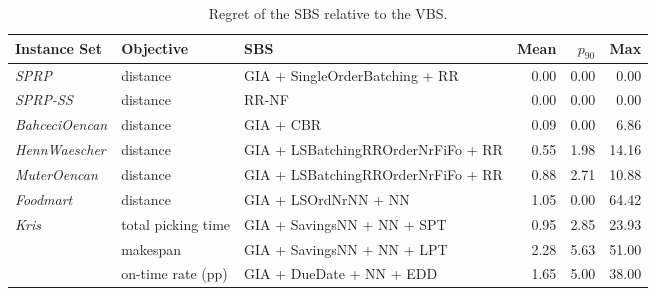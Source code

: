 \begin{table}[tbp]
\centering
\caption{Regret of the SBS relative to the VBS.}
\label{tab:selection}
\small
\begin{tabular}{@{}lllrrr@{}}
\toprule
Instance Set & Objective & SBS & Mean & $p_{90}$ & Max \\
\midrule
\textit{SPRP} & distance & GIA + SingleOrderBatching + RR & 0.00 & 0.00 & 0.00 \\
\textit{SPRP-SS} & distance & RR-NF & 0.00 & 0.00 & 0.00 \\
\textit{BahceciOencan} & distance & GIA + CBR & 0.09 & 0.00 & 6.86 \\
\textit{HennWaescher} & distance & GIA + LSBatchingRROrderNrFiFo + RR & 0.55 & 1.98 & 14.16 \\
\textit{MuterOencan} & distance & GIA + LSBatchingRROrderNrFiFo + RR & 0.88 & 2.71 & 10.88 \\
\textit{Foodmart} & distance & GIA + LSOrdNrNN + NN & 1.05 & 0.00 & 64.42 \\
\textit{Kris} & total picking time & GIA + SavingsNN + NN + SPT & 0.95 & 2.85 & 23.93 \\
 & makespan & GIA + SavingsNN + NN + LPT & 2.28 & 5.63 & 51.00 \\
 & on-time rate (pp) & GIA + DueDate + NN + EDD & 1.65 & 5.00 & 38.00 \\
\bottomrule
\end{tabular}
\end{table}
